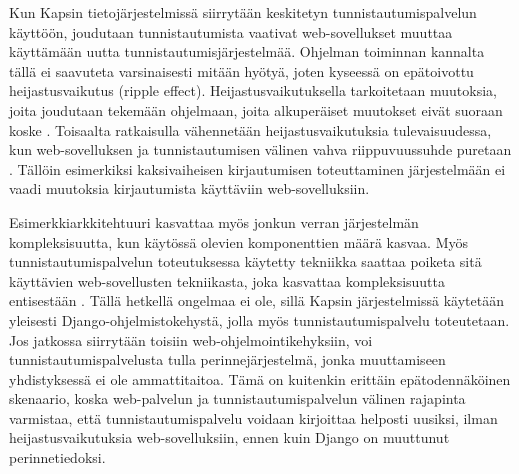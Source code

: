Kun Kapsin tietojärjestelmissä siirrytään keskitetyn tunnistautumispalvelun käyttöön, joudutaan tunnistautumista vaativat web-sovellukset muuttaa käyttämään uutta tunnistautumisjärjestelmää. Ohjelman toiminnan kannalta tällä ei saavuteta varsinaisesti mitään hyötyä, joten kyseessä on epätoivottu heijastusvaikutus (ripple effect). Heijastusvaikutuksella tarkoitetaan muutoksia, joita joudutaan tekemään ohjelmaan, joita alkuperäiset muutokset eivät suoraan koske \cite{arkkitehtuurit}. Toisaalta ratkaisulla vähennetään heijastusvaikutuksia tulevaisuudessa, kun web-sovelluksen ja tunnistautumisen välinen vahva riippuvuussuhde puretaan \cite{arkkitehtuurit}. Tällöin esimerkiksi kaksivaiheisen kirjautumisen toteuttaminen järjestelmään ei vaadi muutoksia kirjautumista käyttäviin web-sovelluksiin.

Esimerkkiarkkitehtuuri kasvattaa myös jonkun verran järjestelmän kompleksisuutta, kun käytössä olevien komponenttien määrä kasvaa. Myös tunnistautumispalvelun toteutuksessa käytetty tekniikka saattaa poiketa sitä käyttävien web-sovellusten tekniikasta, joka kasvattaa kompleksisuutta entisestään \cite{arkkitehtuurit}. Tällä hetkellä ongelmaa ei ole, sillä Kapsin järjestelmissä käytetään yleisesti Django-ohjelmistokehystä, jolla myös tunnistautumispalvelu toteutetaan. Jos jatkossa siirrytään toisiin web-ohjelmointikehyksiin, voi tunnistautumispalvelusta tulla perinnejärjestelmä, jonka muuttamiseen yhdistyksessä ei ole ammattitaitoa. Tämä on kuitenkin erittäin epätodennäköinen skenaario, koska web-palvelun ja tunnistautumispalvelun välinen rajapinta varmistaa, että tunnistautumispalvelu voidaan kirjoittaa helposti uusiksi, ilman heijastusvaikutuksia web-sovelluksiin, ennen kuin Django on muuttunut perinnetiedoksi.